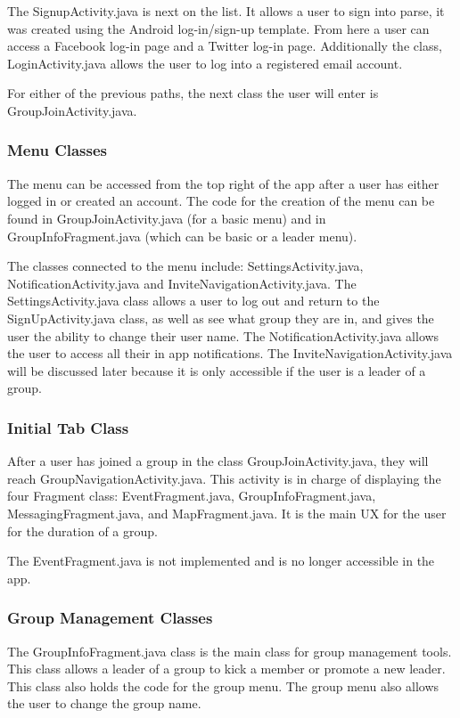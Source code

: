  	The SignupActivity.java is next on the list. It allows a user to sign into parse, it was created using the Android log-in/sign-up template. From here a user can access a Facebook log-in page and a Twitter log-in page. Additionally the class, LoginActivity.java allows the user to log into a registered email account.
 	
 	For either of the previous paths, the next class the user will enter is GroupJoinActivity.java.
 	\subsubsection{Menu Classes}
 	The menu can be accessed from the top right of the app after a user has either logged in or created an account. The code for the creation of the menu can be found in GroupJoinActivity.java (for a basic menu) and in GroupInfoFragment.java (which can be basic or a leader menu). 
 	
 	The classes connected to the menu include: SettingsActivity.java, NotificationActivity.java and InviteNavigationActivity.java.  The SettingsActivity.java class allows a user to log out and return to the SignUpActivity.java class, as well as see what group they are in, and gives the user the ability to change their user name. The NotificationActivity.java allows the user to access all their in app notifications. The InviteNavigationActivity.java will be discussed later because it is only accessible if the user is a leader of a group.
 	\subsubsection{Initial Tab Class}
 	After a user has joined a group in the class GroupJoinActivity.java, they will reach GroupNavigationActivity.java. This activity is in charge of displaying the four Fragment class: EventFragment.java, GroupInfoFragment.java, MessagingFragment.java, and MapFragment.java. It is the main UX for the user for the duration of a group.
 	
 	The EventFragment.java is not implemented and is no longer accessible in the app.
 	\subsubsection{Group Management Classes}
 	The GroupInfoFragment.java class is the main class for group management tools. This class allows a leader of a group to kick a member or promote a new leader. This class also holds the code for the group menu. The group menu also allows the user to change the group name.
 	
